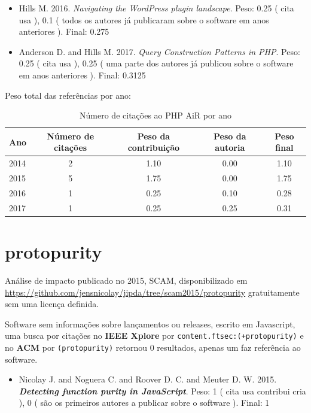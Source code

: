 \begin{itemize}
\item Hills M.
      2016.
        \textit{ Navigating the WordPress plugin landscape}.
      Peso:
      0.25 (
          cita
          usa
      ),
      0.1 (
todos os autores já publicaram sobre o software em anos anteriores
      ).
      Final:
      0.275

\item Anderson D. and Hills M.
      2017.
        \textit{ Query Construction Patterns in PHP}.
      Peso:
      0.25 (
          cita
          usa
      ),
      0.25 (
uma parte dos autores já publicou sobre o software em anos anteriores
      ).
      Final:
      0.3125

\end{itemize}

Peso total das referências por ano:

\begin{table}[h]
\caption{Número de citações ao PHP AiR por ano}
\centering
\begin{tabular}{| l | c | c | c | c |}
  \hline
  Ano & Número de citações & Peso da contribuição & Peso da autoria & Peso final \\
  \hline
  2014
    & 2
    & 1.10
    & 0.00
    & 1.10 \\
  2015
    & 5
    & 1.75
    & 0.00
    & 1.75 \\
  2016
    & 1
    & 0.25
    & 0.10
    & 0.28 \\
  2017
    & 1
    & 0.25
    & 0.25
    & 0.31 \\
  \hline
\end{tabular}
\end{table}


\section{protopurity}

Análise de impacto
publicado no 2015, SCAM,
disponibilizado em \url{https://github.com/jensnicolay/jipda/tree/scam2015/protopurity}
gratuitamente
sem uma licença definida.

Software sem informações sobre lançamentos ou releases,
escrito em Javascript,
uma busca por citações no {\bf IEEE Xplore} por
\texttt{content.ftsec:(+protopurity)}
e no {\bf ACM} por
\texttt{(protopurity)}
retornou
0 resultados,
apenas um faz referência ao software.

\begin{itemize}
\item Nicolay J. and Noguera C. and Roover D. C. and Meuter D. W.
      2015.
        \textbf{\textit{ Detecting function purity in JavaScript}}.
      Peso:
      1 (
          cita
          usa
          contribui
          cria
      ),
      0 (
são os primeiros autores a publicar sobre o software
      ).
      Final:
      1

\end{itemize}

